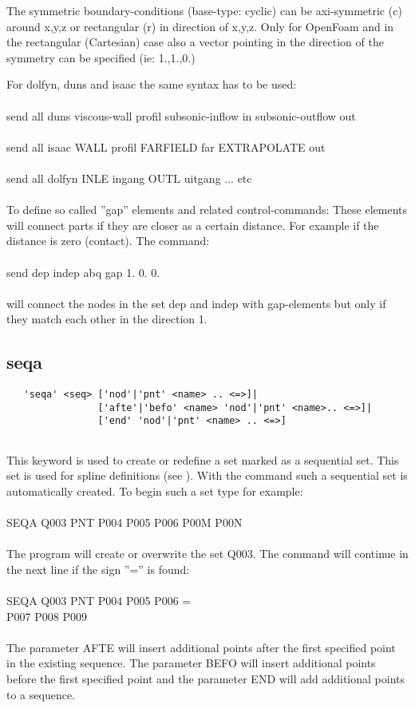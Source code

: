 \documentclass{article}
\begin{document}
The symmetric boundary-conditions (base-type: cyclic) can be axi-symmetric (c) around x,y,z or rectangular (r) in direction of x,y,z. Only for OpenFoam and in the rectangular (Cartesian) case also a vector pointing in the direction of the symmetry can be specified (ie: 1.,1.,0.)

 For dolfyn, duns and isaac the same syntax has to be used:\\\\send all duns viscous-wall profil subsonic-inflow in subsonic-outflow out\\\\send all isaac WALL profil FARFIELD far EXTRAPOLATE out\\\\send all dolfyn INLE ingang OUTL uitgang ... etc\\\\

To define so called ''gap'' elements and related control-commands: These elements will connect parts if they are closer as a certain distance. For example if the distance is zero (contact). The command:\\\\send dep indep abq gap 1. 0. 0.\\\\will connect the nodes in the set dep and indep with gap-elements but only if they match each other in the direction 1.

\subsection{\label{seqa}seqa}
\begin{verbatim}
   'seqa' <seq> ['nod'|'pnt' <name> .. <=>]|
                ['afte'|'befo' <name> 'nod'|'pnt' <name>.. <=>]|
                ['end' 'nod'|'pnt' <name> .. <=>]
                 
\end{verbatim}
This keyword is used to create or redefine a set marked as a sequential set. This set is used for spline definitions (see ). With the command  such a sequential set is automatically created. To begin such a set type for example:\\\\SEQA  Q003     PNT  P004 P005 P006 P00M P00N\\\\The program will create or overwrite the set Q003. The command will continue in the next line if the sign ''='' is found:\\\\SEQA  Q003     PNT  P004 P005 P006 =\\                    P007 P008 P009\\\\The parameter AFTE will insert additional points after the first specified point in the existing sequence. The parameter BEFO will insert additional points before the first specified point and the parameter END will add additional points to a sequence.
\end{document}
